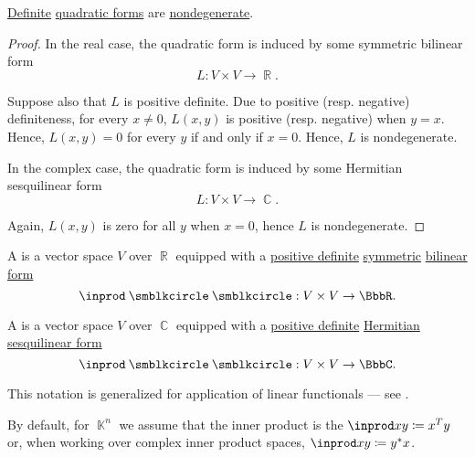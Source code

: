 \begin{proposition}\label{thm:quadratic_forms_are_nondegenerate}
  \hyperref[thm:quadratic_forms_definiteness]{Definite} \hyperref[thm:quadratic_forms]{quadratic forms} are \hyperref[def:degenerate_bilinear_form]{nondegenerate}.
\end{proposition}
\begin{proof}
  In the real case, the quadratic form is induced by some symmetric bilinear form
  \begin{equation*}
    L: V \times V \to \BbbR.
  \end{equation*}

  Suppose also that \( L \) is positive definite. Due to positive (resp. negative) definiteness, for every \( x \neq 0 \), \( L(x, y) \) is positive (resp. negative) when \( y = x \). Hence, \( L(x, y) = 0 \) for every \( y \) if and only if \( x = 0 \). Hence, \( L \) is nondegenerate.

  In the complex case, the quadratic form is induced by some Hermitian sesquilinear form
  \begin{equation*}
    L: V \times V \to \BbbC.
  \end{equation*}

  Again, \( L(x, y) \) is zero for all \( y \) when \( x = 0 \), hence \( L \) is nondegenerate.
\end{proof}

\begin{definition}\label{def:inner_product_space}\mimprovised
  A  is a vector space \( V \) over \( \BbbR \) equipped with a \hyperref[thm:quadratic_forms_definiteness/positive_definite]{positive definite} \hyperref[def:symmetric_function]{symmetric} \hyperref[def:bilinear_form]{bilinear form}
  \begin{equation*}
    \inprod \anon \anon: V \times V \to \BbbR.
  \end{equation*}

  A  is a vector space \( V \) over \( \BbbC \) equipped with a \hyperref[thm:quadratic_forms_definiteness/positive_definite]{positive definite} \hyperref[def:hermitian_form]{Hermitian} \hyperref[def:sesquilinear_form]{sesquilinear form}
  \begin{equation*}
    \inprod \anon \anon: V \times V \to \BbbC.
  \end{equation*}

  This notation is generalized for application of linear functionals --- see .

  By default, for \( \BbbK^n \) we assume that the inner product is the  \( \inprod x y \coloneqq x^T y \) or, when working over complex inner product spaces, \( \inprod x y \coloneqq y^* x \).
\end{definition}

